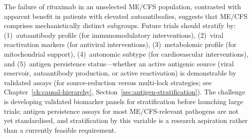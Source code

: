 \begin{open_question}
\label{oq:stratified-trials}
The failure of rituximab in an unselected ME/CFS population, contrasted with apparent benefit in patients with elevated autoantibodies, suggests that ME/CFS comprises mechanistically distinct subgroups. Future trials should stratify by: (1)~autoantibody profile (for immunomodulatory interventions), (2)~viral reactivation markers (for antiviral interventions), (3)~metabolomic profile (for mitochondrial support), (4)~autonomic subtype (for cardiovascular interventions), and (5)~antigen persistence status---whether an active antigenic source (viral reservoir, autoantibody production, or active reactivation) is demonstrable by validated assays (for source-reduction versus multi-lock strategies; see Chapter~\ref{ch:causal-hierarchy}, Section~\ref{sec:antigen-stratification}). The challenge is developing validated biomarker panels for stratification before launching large trials; antigen persistence assays for most ME/CFS-relevant pathogens are not yet standardised, and stratification by this variable is a research aspiration rather than a currently feasible requirement.
\end{open_question}


